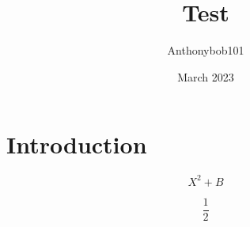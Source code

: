 \documentclass{article}
\title{Test}
\author{Anthonybob101}
\date{March 2023}
\begin{document}
\maketitle

\section*{Introduction}

  \begin{equation}
    X^2+B
  \end{equation}

  \[
    \frac{1}{2}
  \]
  
  
\end{document}
